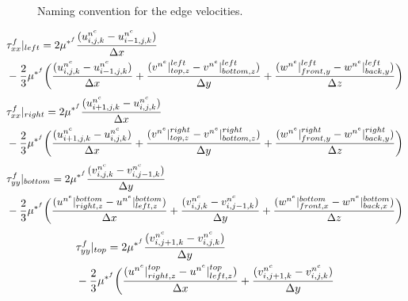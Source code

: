 \documentclass[fleqn]{article}
\begin{document}
{\begin{figure}
    \caption{Naming convention for the edge velocities.}
    \label{fig:edgevel}
\end{figure}
\begin{align*}
    \label{eq:tau_xx_d}
&       \tau^{f}_{xx}|_{left} =
    2   \mu^{*^{f}} \frac{ (\uvelnc_{i,j,k} - \uvelnc_{i-1,j,k}) }{ \delx }\\ 
&   -   \frac{2}{3}\mu^{*^{f}}\biggr(\frac{ (\uvelnc_{i,j,k} - \uvelnc_{i-1,j,k}) }{ \delx }
    +   \frac{ (v^{n^{e}}|^{left}_{top,z}   - v^{n^{e}}|^{left}_{bottom,z}) }{ \dely } 
    +   \frac{ (w^{n^{e}}|^{left}_{front,y} - w^{n^{e}}|^{left}_{back,y}) }{ \delz }\biggl)
\end{align*}
%
%
%
\begin{align*}
&       \tau^{f}_{xx}|_{right}= 
    2   \mu^{*^{f}} \frac{ (\uvelnc_{i+1,j,k} - \uvelnc_{i,j,k}) }{ \delx } \\ 
&   -   \frac{2}{3}\mu^{*^{f}}\biggr(\frac{ (\uvelnc_{i+1,j,k} - \uvelnc_{i,j,k}) }{ \delx }
    +   \frac{ (v^{n^{e}}|^{right}_{top,z}   - v^{n^{e}}|^{right}_{bottom,z}) }{ \dely } 
    +   \frac{ (w^{n^{e}}|^{right}_{front,y} - w^{n^{e}}|^{right}_{back,y}) }{ \delz }\biggl)
\end{align*}
%
%
\begin{align*}
    &   \tau^{f}_{yy}|_{bottom} = 
    2   \mu^{*^{f}} \frac{ (\vvelnc_{i,j,k} - \vvelnc_{i,j-1,k}) }{ \dely }\\ 
&   -   \frac{2}{3}\mu^{*^{f}}\biggr(\frac{ (u^{n^{e}}|^{bottom}_{right,z} - u^{n^{e}}|^{bottom}_{left,z}) }{ \delx }
    +   \frac{ (\vvelnc_{i,j,k} - \vvelnc_{i,j-1,k}) }{ \dely } 
    +   \frac{ (w^{n^{e}}|^{bottom}_{front,x} - w^{n^{e}}|^{bottom}_{back,x}) }{ \delz }\biggl )
\end{align*}
%
%
%
%
\begin{align*}
&       \tau^{f}_{yy}|_{top} = 
    2   \mu^{*^{f}} \frac{ (\vvelnc_{i,j+1,k} - \vvelnc_{i,j,k}) }{ \dely } \\
&   -   \frac{2}{3}\mu^{*^{f}}\biggr(\frac{ (u^{n^{e}}|^{top}_{right,z} - u^{n^{e}}|^{top}_{left,z}) }{ \delx }
    +   \frac{ (\vvelnc_{i,j+1,k} - \vvelnc_{i,j,k}) }{ \dely } 

\end{align*}}
\end{document}
